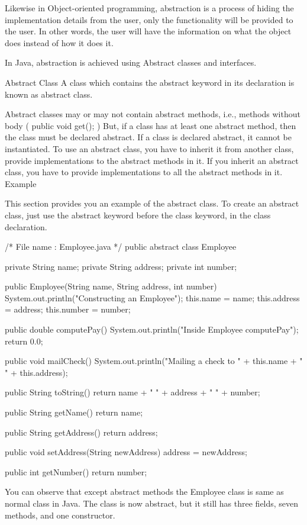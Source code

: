 Likewise in Object-oriented programming, abstraction is a process of hiding the implementation details from the user, only the functionality will be provided to the user. In other words, the user will have the information on what the object does instead of how it does it.

In Java, abstraction is achieved using Abstract classes and interfaces.

Abstract Class
A class which contains the abstract keyword in its declaration is known as abstract class.

Abstract classes may or may not contain abstract methods, i.e., methods without body ( public void get(); )
But, if a class has at least one abstract method, then the class must be declared abstract.
If a class is declared abstract, it cannot be instantiated.
To use an abstract class, you have to inherit it from another class, provide implementations to the abstract methods in it.
If you inherit an abstract class, you have to provide implementations to all the abstract methods in it.
Example

This section provides you an example of the abstract class. To create an abstract class, just use the abstract keyword before the class keyword, in the class declaration.

/* File name : Employee.java */
public abstract class Employee {
   private String name;
   private String address;
   private int number;

   public Employee(String name, String address, int number) {
      System.out.println("Constructing an Employee");
      this.name = name;
      this.address = address;
      this.number = number;
   }

   public double computePay() {
     System.out.println("Inside Employee computePay");
     return 0.0;
   }

   public void mailCheck() {
      System.out.println("Mailing a check to " + this.name + " " + this.address);
   }

   public String toString() {
      return name + " " + address + " " + number;
   }

   public String getName() {
      return name;
   }

   public String getAddress() {
      return address;
   }

   public void setAddress(String newAddress) {
      address = newAddress;
   }

   public int getNumber() {
      return number;
   }
}
You can observe that except abstract methods the Employee class is same as normal class in Java. The class is now abstract, but it still has three fields, seven methods, and one constructor.

